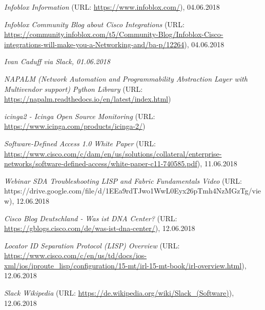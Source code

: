 \begin{thebibliography}{}
	 \textit{Infoblox Information} (URL: \url{https://www.infoblox.com/}), 04.06.2018
	
	 \textit{Infoblox Community Blog about Cisco Integrations} (URL: \url{https://community.infoblox.com/t5/Community-Blog/Infoblox-Cisco-integrations-will-make-you-a-Networking-and/ba-p/12264}), 04.06.2018
	
	 \textit{Ivan Caduff via Slack, 01.06.2018}
	
	 \textit{NAPALM (Network Automation and Programmability Abstraction Layer with Multivendor support) Python Library} (URL: \url{https://napalm.readthedocs.io/en/latest/index.html})
	
	 \textit{icinga2 - Icinga Open Source Monitoring} (URL: \url{https://www.icinga.com/products/icinga-2/})
	
	 \textit{Software-Defined Access 1.0 White Paper} (URL: \url{https://www.cisco.com/c/dam/en/us/solutions/collateral/enterprise-networks/software-defined-access/white-paper-c11-740585.pdf}), 11.06.2018
	
	 \textit{Webinar SDA Troubleshooting LISP and Fabric Fundamentals Video} (URL: https://drive.google.com/file/d/1EEa9rdTJwo1WwL0Eyx26pTmh4NzMGzTg/view), 12.06.2018
	
	 \textit{Cisco Blog Deutschland - Was ist DNA Center?} (URL: \url{https://gblogs.cisco.com/de/was-ist-dna-center/}), 12.06.2018
	
	 \textit{Locator ID Separation Protocol (LISP) Overview} (URL: \url{https://www.cisco.com/c/en/us/td/docs/ios-xml/ios/iproute\_lisp/configuration/15-mt/irl-15-mt-book/irl-overview.html}), 12.06.2018
	
	 \textit{Slack Wikipedia} (URL: \url{https://de.wikipedia.org/wiki/Slack\_(Software)}), 12.06.2018
	
\end{thebibliography}
